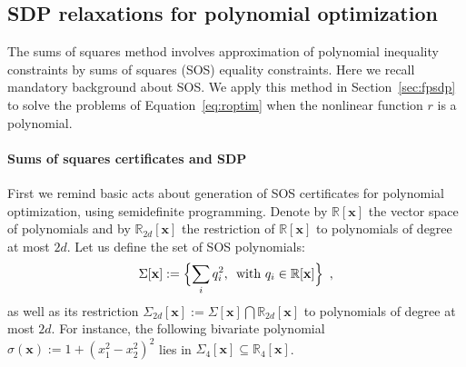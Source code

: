 \documentclass[preprint,fleqn,nocopyrightspace]{sigplanconf}
\newcommand{\R}{\mathbb{R}}
\newcommand{\x}{\mathbf{x}}
\theoremstyle{plain}
\begin{document}
\subsection{SDP relaxations for polynomial optimization}
\label{sec:sdpbackground}
The sums of squares method involves approximation of polynomial inequality constraints by sums of squares (SOS) equality constraints. Here we recall mandatory background about SOS. We apply this method in Section~\ref{sec:fpsdp} to solve the problems of Equation~\eqref{eq:roptim} when the nonlinear function $r$ is a polynomial.
%
\paragraph{Sums of squares certificates and SDP}
%
First we remind basic acts about generation of SOS certificates for polynomial optimization, using semidefinite programming.
Denote by $\R[\x]$ the vector space of polynomials and by $\R_{2 d}[\x]$ the restriction of $\R[\x]$ to polynomials of degree at most $2 d$. Let us define the set of SOS polynomials:
\begin{equation}
\label{eq:cone_sos}
\Sigma[\x] := \Bigl\{\sum_i q_i^2, \, \text{ with } q_i \in \R[\x] \Bigr\}\enspace,
\end{equation}
%
as well as its restriction $\Sigma_{2 d}[\x] := \Sigma[\x] \bigcap \R_{2 d}[\x]$ to polynomials of degree at most $2 d$. For instance, the following bivariate polynomial  $\sigma (\x) := 1 + (x_1^2 - x_2^2)^2$ lies in $\Sigma_4[\x] \subseteq \R_4[\x]$.
\end{document}
